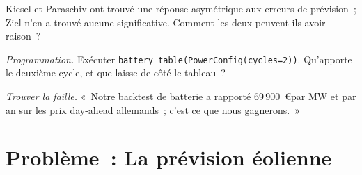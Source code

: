 \begin{exercise}[$\star\star$]\label{exo:s2:power-and-gas-trading:6}
Kiesel et Paraschiv ont trouvé une réponse asymétrique aux erreurs de prévision~; Ziel n'en a trouvé aucune significative. Comment les deux peuvent-ils avoir raison~?
\end{exercise}

\begin{exercise}[$\star\star\star$]\label{exo:s2:power-and-gas-trading:7}
\emph{Programmation.} Exécuter \texttt{battery\_table(PowerConfig(cycles=2))}. Qu'apporte le deuxième cycle, et que laisse de côté le tableau~?
\end{exercise}

\begin{exercise}[$\star\star\star$]\label{exo:s2:power-and-gas-trading:8}
\emph{Trouver la faille.} «~Notre backtest de batterie a rapporté 69\,900~\euro par MW et par an sur les prix day-ahead allemands~; c'est ce que nous gagnerons.~»
\end{exercise}

\section{Problème~: La prévision éolienne}

